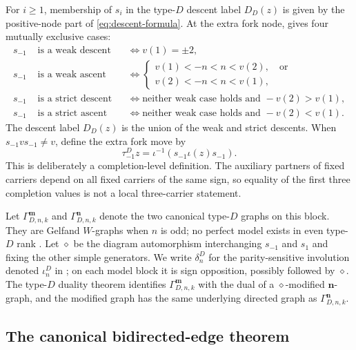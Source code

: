 \documentclass[11pt]{article}
\theoremstyle{definition}
\theoremstyle{remark}
\newcommand{\mgraph}{\mathbf m}
\newcommand{\ngraph}{\mathbf n}
\begin{document}
For $i\geq1$, membership of $s_i$ in the type-$D$ descent label
$D_D(z)$ is given by the positive-node part of
\eqref{eq:descent-formula}.  At the extra fork node,
\cite[Proposition~2.5(c)]{MZGelfand} gives four mutually exclusive cases:
\begin{align*}
 s_{-1}&\text{ is a weak descent} &&\Longleftrightarrow v(1)=\pm2,\\
 s_{-1}&\text{ is a weak ascent}  &&\Longleftrightarrow
 \begin{cases}
 v(1)<-n<n<v(2),\quad\text{or}\\
 v(2)<-n<n<v(1),
 \end{cases}\\
 s_{-1}&\text{ is a strict descent}&&\Longleftrightarrow
 \text{neither weak case holds and }-v(2)>v(1),\\
 s_{-1}&\text{ is a strict ascent}&&\Longleftrightarrow
 \text{neither weak case holds and }-v(2)<v(1).
\end{align*}
The descent label $D_D(z)$ is the union of the weak and strict descents.
When $s_{-1}vs_{-1}\ne v$, define the extra fork move by
\begin{equation}
 \tau^D_{-1}z=\iota^{-1}(s_{-1}\iota(z)s_{-1}).
 \label{eq:type-D-fork-toggle}
\end{equation}
This is deliberately a completion-level definition.  The auxiliary
partners of fixed carriers depend on all fixed carriers of the same sign,
so equality of the first three completion values is not a local
three-carrier statement.

Let $\Gamma^{\mgraph}_{D,n,k}$ and $\Gamma^{\ngraph}_{D,n,k}$ denote the
two canonical type-$D$ graphs on this block.  They are Gelfand $W$-graphs
when $n$ is odd; no perfect model exists in even type-$D$ rank
\cite{MZPerfect}.  Let $\diamond$ be the diagram automorphism interchanging
$s_{-1}$ and $s_1$ and fixing the other simple generators.  We write
$\delta_n^D$ for the parity-sensitive involution denoted $\iota_n^D$ in
\cite[(3.26)]{MZGelfand}; on each model block it is sign opposition,
possibly followed by $\diamond$.  The type-$D$ duality theorem
\cite[Theorem~1.13]{MZGelfand} identifies
$\Gamma^{\mgraph}_{D,n,k}$ with the dual of a $\diamond$-modified
$\ngraph$-graph, and the modified graph has the same underlying directed
graph as $\Gamma^{\ngraph}_{D,n,k}$.

\subsection{The canonical bidirected-edge theorem}
\end{document}
